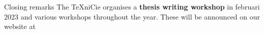\begin{frame}{Closing remarks}
The \TeX niCie organises a \textbf{thesis writing workshop} in februari 2023 and various workshops throughout the year.
These will be announced on our website at
\begin{center}
\end{center}
\end{frame}